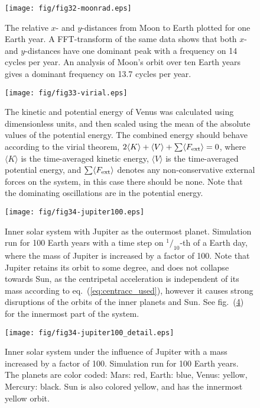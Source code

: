 \documentclass[a4paper,11pt]{article}
\begin{document}
\begin{figure}[htb]
    \centering
    \texttt{[image: fig/fig32-moonrad.eps]}
    \caption{The relative $x$- and $y$-distances from Moon to Earth plotted for one Earth year. A FFT-transform of the same data shows that both $x$- and $y$-distances have one dominant peak with a frequency on 14 cycles per year. An analysis of Moon's orbit over ten Earth years gives a dominant frequency on 13.7 cycles per year.}
    \label{fig:32}
\end{figure}

\begin{figure}[htb]
    \centering
    \texttt{[image: fig/fig33-virial.eps]}
    \caption{The kinetic and potential energy of Venus was calculated using dimensionless units, and then scaled using the mean of the absolute values of the potential energy. The combined energy should behave according to the virial theorem, $2\langle K \rangle + \langle V \rangle + \sum \langle F_{\rm ext} \rangle = 0$, where $\langle K \rangle$ is the time-averaged kinetic energy, $\langle V \rangle $ is the time-averaged potential energy, and $\sum \langle F_{\rm ext} \rangle$ denotes any non-conservative external forces on the system, in this case there should be none. Note that the dominating oscillations are in the potential energy.}
    \label{fig:33}
\end{figure}

\begin{figure}[htb]
    \centering
    \texttt{[image: fig/fig34-jupiter100.eps]}
    \caption{Inner solar system with Jupiter as the outermost planet. Simulation run for 100 Earth years with a time step on $^1\!/_{10}$-th of a Earth day, where the mass of Jupiter is increased by a factor of 100. Note that Jupiter retains its orbit to some degree, and does not collapse towards Sun, as the centripetal acceleration is independent of its mass according to eq.~(\ref{eq:centracc_used}), however it causes strong disruptions of the orbits of the inner planets and Sun. See fig.~(\ref{fig:34b}) for the innermost part of the system.}
    \label{fig:34}
\end{figure}

\begin{figure}[htb]
    \centering
    \texttt{[image: fig/fig34-jupiter100\_detail.eps]}
    \caption{Inner solar system under the influence of Jupiter with a mass increased by a factor of 100. Simulation run for 100 Earth years. The planets are color coded: Mars: red, Earth: blue, Venus: yellow, Mercury: black. Sun is also colored yellow, and has the innermost yellow orbit.}
    \label{fig:34b}
\end{figure}
\end{document}
